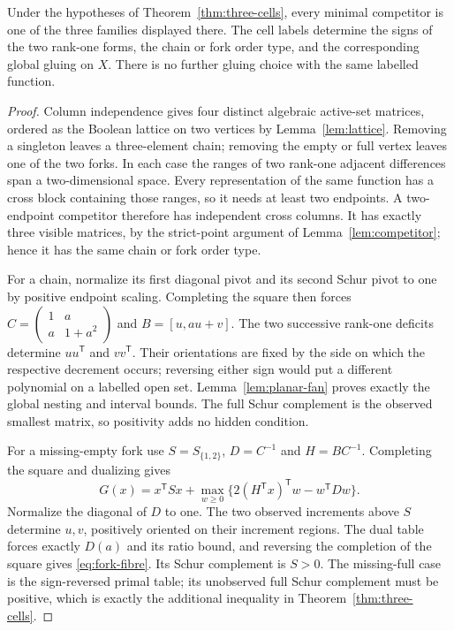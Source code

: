 \begin{proposition}\label{prop:planar-exhaustion}
Under the hypotheses of Theorem~\ref{thm:three-cells}, every minimal competitor is one of the three families displayed there. The cell labels determine the signs of the two rank-one forms, the chain or fork order type, and the corresponding global gluing on $X$. There is no further gluing choice with the same labelled function.
\end{proposition}
\begin{proof}
Column independence gives four distinct algebraic active-set matrices, ordered as the Boolean lattice on two vertices by Lemma~\ref{lem:lattice}. Removing a singleton leaves a three-element chain; removing the empty or full vertex leaves one of the two forks. In each case the ranges of two rank-one adjacent differences span a two-dimensional space. Every representation of the same function has a cross block containing those ranges, so it needs at least two endpoints. A two-endpoint competitor therefore has independent cross columns. It has exactly three visible matrices, by the strict-point argument of Lemma~\ref{lem:competitor}; hence it has the same chain or fork order type.

For a chain, normalize its first diagonal pivot and its second Schur pivot to one by positive endpoint scaling. Completing the square then forces $C=\left(\begin{smallmatrix}1&a\\a&1+a^2\end{smallmatrix}\right)$ and $B=[u,au+v]$. The two successive rank-one deficits determine $uu^{\mathsf T}$ and $vv^{\mathsf T}$. Their orientations are fixed by the side on which the respective decrement occurs; reversing either sign would put a different polynomial on a labelled open set. Lemma~\ref{lem:planar-fan} proves exactly the global nesting and interval bounds. The full Schur complement is the observed smallest matrix, so positivity adds no hidden condition.

For a missing-empty fork use $S=S_{\{1,2\}}$, $D=C^{-1}$ and $H=BC^{-1}$. Completing the square and dualizing gives
\[
 G(x)=x^{\mathsf T}Sx+\max_{w\ge0}\{2(H^{\mathsf T}x)^{\mathsf T}w-w^{\mathsf T}Dw\}.
\]
Normalize the diagonal of $D$ to one. The two observed increments above $S$ determine $u,v$, positively oriented on their increment regions. The dual table forces exactly $D(a)$ and its ratio bound, and reversing the completion of the square gives \eqref{eq:fork-fibre}. Its Schur complement is $S>0$. The missing-full case is the sign-reversed primal table; its unobserved full Schur complement must be positive, which is exactly the additional inequality in Theorem~\ref{thm:three-cells}.


\end{proof}
